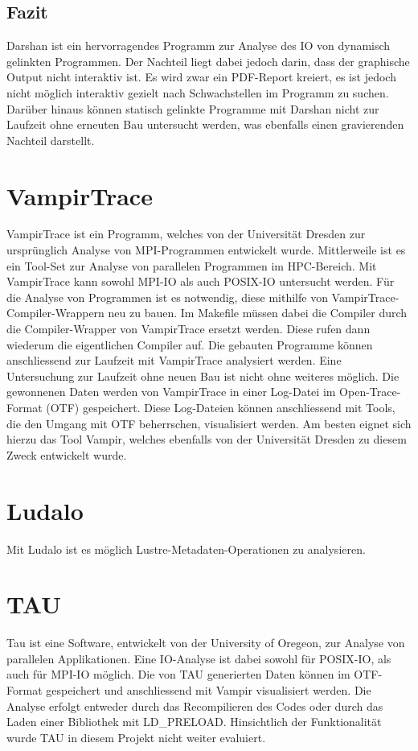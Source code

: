 \subsection{Fazit}
Darshan ist ein hervorragendes Programm zur Analyse des IO von dynamisch gelinkten Programmen. Der Nachteil liegt dabei jedoch darin, dass der graphische Output nicht interaktiv ist. Es wird zwar ein PDF-Report kreiert, es ist jedoch nicht m\"oglich interaktiv gezielt nach Schwachstellen im Programm zu suchen. Dar\"uber hinaus k\"onnen statisch gelinkte Programme mit Darshan nicht zur Laufzeit ohne erneuten Bau untersucht werden, was ebenfalls einen gravierenden Nachteil darstellt. 
\section{VampirTrace}
VampirTrace ist ein Programm, welches von der Universit\"at Dresden zur urspr\"unglich Analyse von MPI-Programmen entwickelt wurde. Mittlerweile ist es ein Tool-Set zur Analyse von parallelen Programmen im HPC-Bereich. Mit VampirTrace kann sowohl MPI-IO als auch POSIX-IO untersucht werden. F\"ur die Analyse von Programmen ist es notwendig, diese mithilfe von VampirTrace-Compiler-Wrappern neu zu bauen. Im Makefile m\"ussen dabei die Compiler durch die Compiler-Wrapper von VampirTrace ersetzt werden. Diese rufen dann wiederum die eigentlichen Compiler auf. Die gebauten Programme k\"onnen anschliessend zur Laufzeit mit VampirTrace analysiert werden. Eine Untersuchung zur Laufzeit ohne neuen Bau ist nicht ohne weiteres m\"oglich.\newline\newline
Die gewonnenen Daten werden von VampirTrace in einer Log-Datei im Open-Trace-Format (OTF) gespeichert. Diese Log-Dateien k\"onnen anschliessend mit Tools, die den Umgang mit OTF beherrschen, visualisiert werden. Am besten eignet sich hierzu das Tool Vampir, welches ebenfalls von der Universit\"at Dresden zu diesem Zweck entwickelt wurde.
\cite{TUDresden.2016}
\section{Ludalo}
Mit Ludalo ist es m\"oglich Lustre-Metadaten-Operationen zu analysieren.
\cite{Berger.30.07.2014}
\section{TAU}
Tau ist eine Software, entwickelt von der University of Oregeon, zur Analyse von parallelen Applikationen. Eine IO-Analyse ist dabei sowohl f\"ur POSIX-IO, als auch f\"ur MPI-IO m\"oglich. Die von TAU generierten Daten k\"onnen im OTF-Format gespeichert und anschliessend mit Vampir visualisiert werden. Die Analyse erfolgt entweder durch das Recompilieren des Codes oder durch das Laden einer Bibliothek mit LD\_PRELOAD. Hinsichtlich der Funktionalit\"at wurde TAU in diesem Projekt nicht weiter evaluiert.
\cite{Shende.03.05.2017}\cite{Shende.2011}

